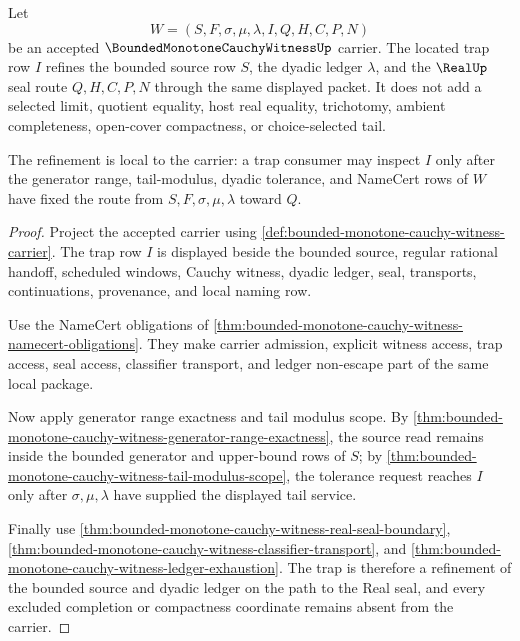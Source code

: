 \begin{theorem}
\label{thm:bounded-monotone-cauchy-witness-located-trap-refinement}
Let
$$
W=(S,F,\sigma,\mu,\lambda,I,Q,H,C,P,N)
$$
be an accepted $\BoundedMonotoneCauchyWitnessUp$ carrier. The located trap row $I$ refines the bounded source row $S$, the dyadic ledger $\lambda$, and the $\RealUp$ seal route $Q,H,C,P,N$ through the same displayed packet. It does not add a selected limit, quotient equality, host real equality, trichotomy, ambient completeness, open-cover compactness, or choice-selected tail.

The refinement is local to the carrier: a trap consumer may inspect $I$ only after the generator range, tail-modulus, dyadic tolerance, and NameCert rows of $W$ have fixed the route from $S,F,\sigma,\mu,\lambda$ toward $Q$.
\end{theorem}
\begin{proof}
Project the accepted carrier using \autoref{def:bounded-monotone-cauchy-witness-carrier}. The trap row $I$ is displayed beside the bounded source, regular rational handoff, scheduled windows, Cauchy witness, dyadic ledger, seal, transports, continuations, provenance, and local naming row.

Use the NameCert obligations of \autoref{thm:bounded-monotone-cauchy-witness-namecert-obligations}. They make carrier admission, explicit witness access, trap access, seal access, classifier transport, and ledger non-escape part of the same local package.

Now apply generator range exactness and tail modulus scope. By \autoref{thm:bounded-monotone-cauchy-witness-generator-range-exactness}, the source read remains inside the bounded generator and upper-bound rows of $S$; by \autoref{thm:bounded-monotone-cauchy-witness-tail-modulus-scope}, the tolerance request reaches $I$ only after $\sigma,\mu,\lambda$ have supplied the displayed tail service.

Finally use \autoref{thm:bounded-monotone-cauchy-witness-real-seal-boundary}, \autoref{thm:bounded-monotone-cauchy-witness-classifier-transport}, and \autoref{thm:bounded-monotone-cauchy-witness-ledger-exhaustion}. The trap is therefore a refinement of the bounded source and dyadic ledger on the path to the Real seal, and every excluded completion or compactness coordinate remains absent from the carrier.
\end{proof}

